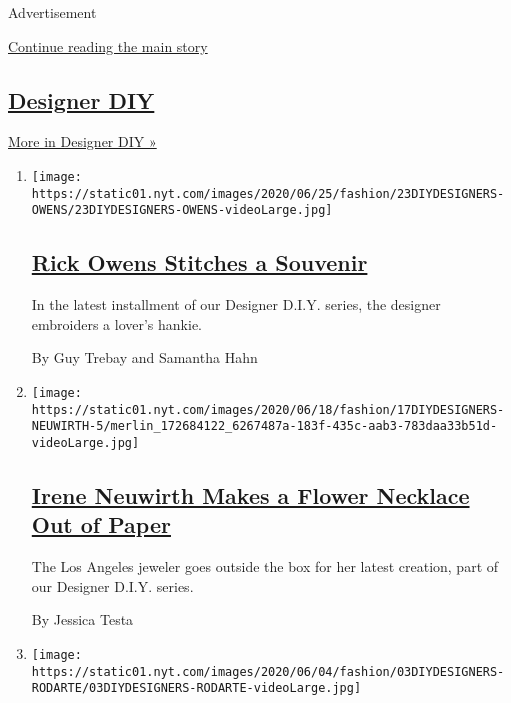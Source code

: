 Advertisement

\protect\hyperlink{after-mid2}{Continue reading the main story}

\hypertarget{designer-diy}{%
\subsection{\texorpdfstring{\href{/issue/fashion/2020/06/19/designer-diy}{Designer
DIY}}{Designer DIY}}\label{designer-diy}}

\href{/issue/fashion/2020/06/19/designer-diy}{More in Designer DIY »}

\begin{enumerate}
\def\labelenumi{\arabic{enumi}.}
\item
  \texttt{[image: https://static01.nyt.com/images/2020/06/25/fashion/23DIYDESIGNERS-OWENS/23DIYDESIGNERS-OWENS-videoLarge.jpg]}

  \hypertarget{rick-owens-stitches-a-souvenir}{%
  \subsection{\texorpdfstring{\href{/2020/06/23/style/DIY-sewing-rick-owens-stitches-a-souvenir.html}{Rick
  Owens Stitches a
  Souvenir}}{Rick Owens Stitches a Souvenir}}\label{rick-owens-stitches-a-souvenir}}

  In the latest installment of our Designer D.I.Y. series, the designer
  embroiders a lover's hankie.

  By Guy Trebay and Samantha Hahn
\item
  \texttt{[image: https://static01.nyt.com/images/2020/06/18/fashion/17DIYDESIGNERS-NEUWIRTH-5/merlin\_172684122\_6267487a-183f-435c-aab3-783daa33b51d-videoLarge.jpg]}

  \hypertarget{irene-neuwirth-makes-a-flower-necklace-out-of-paper}{%
  \subsection{\texorpdfstring{\href{/2020/06/17/style/paper-flower-necklace-DIY.html}{Irene
  Neuwirth Makes a Flower Necklace Out of
  Paper}}{Irene Neuwirth Makes a Flower Necklace Out of Paper}}\label{irene-neuwirth-makes-a-flower-necklace-out-of-paper}}

  The Los Angeles jeweler goes outside the box for her latest creation,
  part of our Designer D.I.Y. series.

  By Jessica Testa
\item
  \texttt{[image: https://static01.nyt.com/images/2020/06/04/fashion/03DIYDESIGNERS-RODARTE/03DIYDESIGNERS-RODARTE-videoLarge.jpg]}


\end{enumerate}
